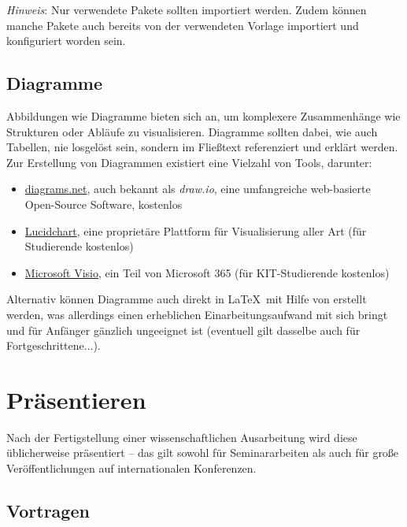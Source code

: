 \noindent
\emph{Hinweis}: Nur verwendete Pakete sollten importiert werden.
Zudem können manche Pakete auch bereits von der verwendeten Vorlage importiert und konfiguriert worden sein.

\subsection{Diagramme}%
\label{sec:Schreiben:Diagramme}

Abbildungen wie Diagramme bieten sich an, um komplexere Zusammenhänge wie Strukturen oder Abläufe zu visualisieren. 
Diagramme sollten dabei, wie auch Tabellen, nie losgelöst sein, sondern im Fließtext referenziert und erklärt werden. 
Zur Erstellung von Diagrammen existiert eine Vielzahl von Tools, darunter:

\smallskip
\begin{itemize}[label={\symbolTool}]
    \item \href{https://www.diagrams.net//}{diagrams.net}, auch bekannt als \emph{draw.io}, eine umfangreiche web-basierte Open-Source Software, kostenlos
    \item \href{https://www.lucidchart.com/}{Lucidchart}, eine proprietäre Plattform für Visualisierung aller Art (für Studierende kostenlos)
    \item \href{https://www.microsoft.com/de-de/microsoft-365/visio}{Microsoft Visio}, ein Teil von Microsoft 365 (für KIT-Studierende kostenlos)
\end{itemize}
\smallskip

\noindent
Alternativ können Diagramme auch direkt in \LaTeX\ mit Hilfe von  erstellt werden, was allerdings einen erheblichen Einarbeitungsaufwand mit sich bringt und für Anfänger gänzlich ungeeignet ist (eventuell gilt dasselbe auch für Fortgeschrittene...).

\section{Präsentieren}%
\label{sec:Praesentieren}

Nach der Fertigstellung einer wissenschaftlichen Ausarbeitung wird diese üblicherweise präsentiert -- das gilt sowohl für Seminararbeiten als auch für große Veröffentlichungen auf internationalen Konferenzen.

\subsection{Vortragen}%
\label{sec:Praesentieren:Vortragen}

